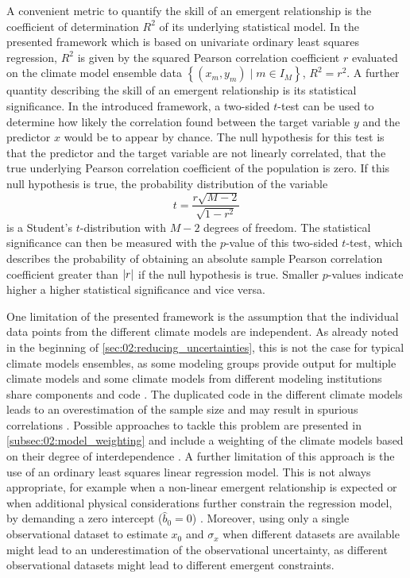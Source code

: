 A convenient metric to quantify the skill of an emergent relationship is the
coefficient of determination $R^2$ of its underlying statistical model. In the
presented framework which is based on univariate ordinary least squares
regression, $R^2$ is given by the squared Pearson correlation coefficient $r$
evaluated on the climate model ensemble data $\left\{ \left( x_m, y_m \right)
\mid m \in I_M \right\}$, \ie{} $R^2 = r^2$. A further quantity describing the
skill of an emergent relationship is its statistical significance. In the
introduced framework, a two-sided $t$-test can be used to determine how likely
the correlation found between the target variable $y$ and the predictor $x$
would be to appear by chance. The null hypothesis for this test is that the
predictor and the target variable are not linearly correlated, \ie{} that the
true underlying Pearson correlation coefficient of the population is zero. If
this null hypothesis is true, the probability distribution of the variable
\begin{equation}
  t = \frac{r \sqrt{M - 2}}{\sqrt{1 - r^2}}
  \label{eq:02:t}
\end{equation}
is a Student's $t$-distribution with $M - 2$ degrees of freedom. The
statistical significance can then be measured with the $p$-value of this
two-sided $t$-test, which describes the probability of obtaining an absolute
sample Pearson correlation coefficient greater than $\abs*{r}$ if the null
hypothesis is true. Smaller $p$-values indicate higher a higher statistical
significance and vice versa.

One limitation of the presented framework is the assumption that the individual
data points from the different climate models are independent. As already noted
in the beginning of \cref{sec:02:reducing_uncertainties}, this is not the case
for typical climate models ensembles, as some modeling groups provide output
for multiple climate models and some climate models from different modeling
institutions share components and code \autocite{Knutti2013}. The duplicated
code in the different climate models leads to an overestimation of the sample
size and may result in spurious correlations \autocite{Sanderson2015}. Possible
approaches to tackle this problem are presented in
\cref{subsec:02:model_weighting} and include a weighting of the climate models
based on their degree of interdependence \autocite{Knutti2017a, Sanderson2015,
  Sanderson2017}. A further limitation of this approach is the use of an
ordinary least squares linear regression model. This is not always appropriate,
for example when a non-linear emergent relationship is expected
\autocite{Nijsse2020} or when additional physical considerations further
constrain the regression model, \eg{} by demanding a zero intercept ($\hat{b}_0
= 0$) \autocite{Annan2020, JimenezdelaCuesta2019}. Moreover, using only a
single observational dataset to estimate $x_0$ and $\sigma_x$ when different
datasets are available might lead to an underestimation of the observational
uncertainty, as different observational datasets might lead to different
emergent constraints.

